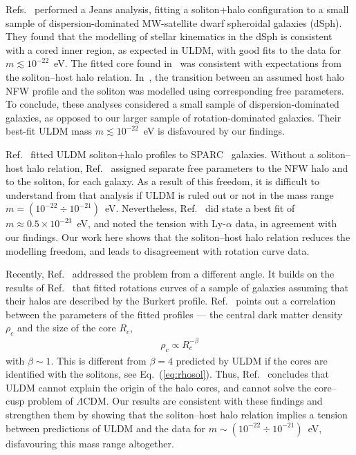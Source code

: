 \documentclass[aps,prd,floats,superscriptaddress,showpacs,nofootinbib,twocolumn,preprintnumbers]{revtex4-1}%
\def\be{\begin{eqnarray}}
\def\ee{\end{eqnarray}}
\begin{document}
Refs.~\cite{Schive:2014dra,Marsh:2015wka} performed a Jeans analysis,
fitting a soliton+halo configuration to a small sample of
dispersion-dominated MW-satellite dwarf spheroidal galaxies
(dSph). They found that the modelling of stellar kinematics in the
dSph is consistent with a cored inner region, as expected in ULDM,
with good fits to the data for $m\lesssim10^{-22}$~eV. The fitted core
found in~\cite{Schive:2014dra} was consistent with expectations from
the soliton--host halo relation. In~\cite{Marsh:2015wka}, the
transition between an assumed host halo NFW profile and the soliton
was modelled using corresponding free parameters. To conclude, these
analyses considered a small sample of dispersion-dominated galaxies,
as opposed to our larger sample of rotation-dominated galaxies. Their
best-fit ULDM mass $m\lesssim 10^{-22}$~eV is disfavoured by our findings. 


Ref.~\cite{Bernal:2017oih} fitted ULDM soliton+halo profiles
to SPARC~\cite{Lelli:2016zqa} galaxies. Without a soliton--host
halo relation, Ref.~\cite{Bernal:2017oih} assigned separate
free parameters to the NFW halo and to the soliton, for each galaxy. As a result of
this freedom, it is difficult to understand from that analysis if ULDM
is ruled out or not in the mass range
$m=(10^{-22}\div 10^{-21})$~eV. Nevertheless, Ref.~\cite{Bernal:2017oih} did
state a best fit of $m\approx0.5\times10^{-23}$~eV, and noted the
tension with Ly-$\alpha$ data, in agreement with our findings.  
Our work here shows that the soliton--host halo relation reduces the modelling freedom, and leads to disagreement with rotation curve data.   

Recently, Ref.~\cite{Deng:2018jjz} addressed the problem from a different
angle. It builds on the results of Ref.~\cite{Rodrigues:2017vto} that
fitted rotations curves of a sample of galaxies assuming that their
halos are described by the Burkert profile. Ref.~\cite{Deng:2018jjz}
points out a correlation between the parameters of the fitted 
profiles --- the central dark matter density $\rho_c$ and the size of
the core $R_c$,
\be
\rho_c\propto R_c^{-\beta}
\ee
with $\beta \sim 1$. This is different from $\beta=4$ predicted by
ULDM if the cores are identified with the solitons, see Eq.~(\ref{eq:rhosol}). Thus, Ref.~\cite{Deng:2018jjz}
concludes that ULDM cannot explain the origin of the halo cores, and
cannot solve the core--cusp problem of $\Lambda$CDM. Our results are
consistent with these findings and strengthen them by showing that the
soliton--host halo relation implies a tension between
predictions of ULDM and the data for $m\sim(10^{-22}\div
10^{-21})$~eV, disfavouring this mass range altogether.  
\end{document}
